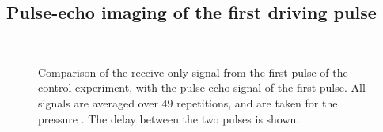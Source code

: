 \subsection{Pulse-echo imaging of the first driving pulse}



\begin{figure}[t]%
  \centering
 \quad\hspace{3mm}
  \\
 \quad\hspace{3mm}
\caption{
    Comparison of the  receive only signal from the first pulse of the control experiment,
    with the pulse-echo signal of the first pulse.
    All signals are averaged over 49 repetitions, and are taken for the pressure \pOOE.
    The delay between the two pulses is shown.
  }
  \label{fig:1st:av:time:comp:control}
\end{figure}

